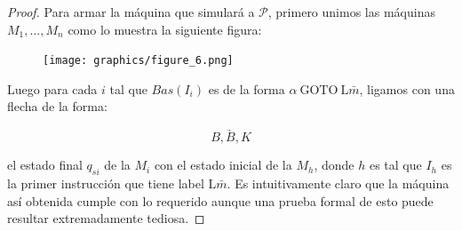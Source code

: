 \begin{proof}
    \PN Para armar la máquina que simulará a $\mathcal{P}$, primero unimos las máquinas $M_{1}, \dotsc, M_{n}$ como lo
    muestra la siguiente figura:

    \begin{figure}[h]
      \centering
      \texttt{[image: graphics/figure\_6.png]}
    \end{figure}

    \pagebreak
    \PN Luego para cada $i$ tal que $Bas(I_{i})$ es de la forma $\alpha \ \mathrm{GOTO} \ \mathrm{L}\bar{m}$, ligamos
    con una flecha de la forma:

		\[
      \underrightarrow{\qquad B,B,K \qquad}
		\]

    \vspace{5mm}
    \PN el estado final $q_{si}$ de la $M_{i}$ con el estado inicial de la $M_{h}$, donde $h$ es tal que $I_{h}$ es la
    primer instrucción que tiene label $\mathrm{L}\bar{m}$. Es intuitivamente claro que la máquina así obtenida cumple
    con lo requerido aunque una prueba formal de esto puede resultar extremadamente tediosa.
	\end{proof}

